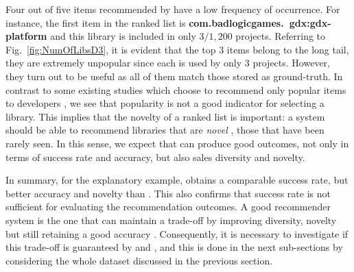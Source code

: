 Four out of five items recommended by \CR have a low frequency of occurrence. For instance, the first item in the 
ranked list is \textbf{com.badlogicgames.\ gdx:gdx-platform} and this library is included in only $3/1,200$ projects. 
Referring to Fig.~\ref{fig:NumOfLibsD3}, it is evident that the top $3$ items belong to the long tail, \ie they are 
extremely unpopular since each is used by only $3$ projects. However, they turn out to be useful as all of them match 
those stored as ground-truth. In contrast to some existing studies which choose to recommend only popular items to 
developers \cite{Ponzanelli:2014:MST:2597073.2597077},\cite{Moreno:2015:IUT:2818754.2818860} we see that popularity is not
a good indicator for selecting a library. This implies that the novelty of a ranked list is important: a system should 
be able to recommend libraries that are \emph{novel} \cite{Castells_noveltyand}, \ie those that have been rarely seen. 
In this sense, we expect that \CR can produce good outcomes, not only in terms of success rate and accuracy, but 
also sales diversity and novelty. 

In summary, for the explanatory example, \CR obtains a comparable success rate, but better accuracy and novelty than \LR. This also confirms that success rate is not sufficient for evaluating the recommendation outcomes. A good recommender system is the one that can maintain a trade-off by improving diversity, novelty but still retaining a good accuracy \cite{Ragone:2017:SLF:3019612.3019837}. Consequently, it is necessary to investigate if this trade-off is guaranteed by \LR and \CR, and this is done in the next sub-sections by considering the whole dataset discussed in the previous section.




